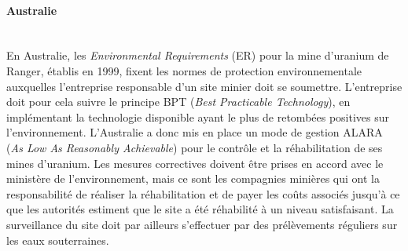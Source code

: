 \documentclass{article}
\begin{document}
\paragraph{Australie \\ \\}

En Australie, les \textit{Environmental Requirements} (ER) pour la mine d’uranium de Ranger, établis en 1999, fixent les normes de protection environnementale auxquelles l’entreprise responsable d’un site minier doit se soumettre.
L’entreprise doit pour cela suivre le principe BPT (\textit{Best Practicable Technology}), en implémentant la technologie disponible ayant le plus de retombées positives sur l’environnement. L’Australie a donc mis en place un mode de gestion ALARA (\textit{As Low As Reasonably Achievable}) pour le contrôle et la réhabilitation de ses mines d’uranium.
Les mesures correctives doivent être prises en accord avec le ministère de l’environnement, mais ce sont les compagnies minières qui ont la responsabilité de réaliser la réhabilitation et de payer les coûts associés jusqu’à ce que les autorités estiment que le site a été réhabilité à un niveau satisfaisant. La surveillance du site doit par ailleurs s’effectuer par des prélèvements réguliers sur les eaux souterraines.
\end{document}
